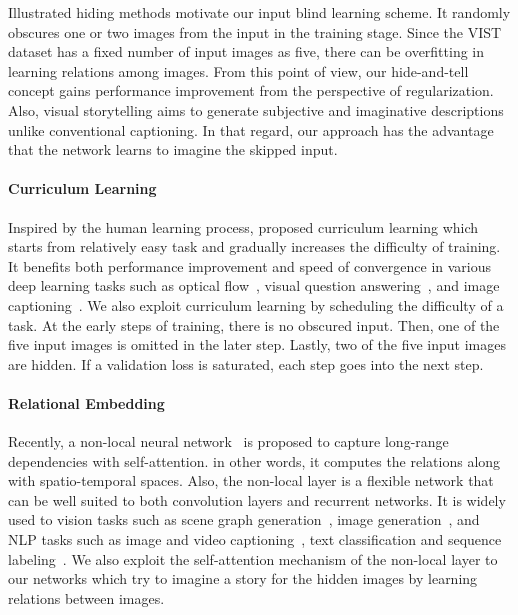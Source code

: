 \documentclass[letterpaper]{article} \usepackage{aaai20}  \usepackage{times}  \usepackage{helvet} \usepackage{courier}  \usepackage[hyphens]{url}  \usepackage{graphicx} \urlstyle{rm} \def\UrlFont{\rm}  \usepackage{graphicx}  \frenchspacing  \setlength{\pdfpagewidth}{8.5in}  \setlength{\pdfpageheight}{11in}
\newcommand{\citet}[1]{\citeauthor{#1} \shortcite{#1}}
\begin{document}
Illustrated hiding methods motivate our input blind learning scheme. It randomly obscures one or two images from the input in the training stage. 
Since the VIST dataset has a fixed number of input images as five, there can be overfitting in learning relations among images. From this point of view, our hide-and-tell concept gains performance improvement from the perspective of regularization.
Also, visual storytelling aims to generate subjective and imaginative descriptions unlike conventional captioning. In that regard, our approach has the advantage that the network learns to imagine the skipped input.






\paragraph{Curriculum Learning}
\quad

\noindent
Inspired by the human learning process, \citet{bengio2009curriculum} proposed curriculum learning which starts from relatively easy task and gradually increases the difficulty of training. It benefits both performance improvement and speed of convergence in various deep learning tasks such as optical flow~\cite{ilg2017flownet}, visual question answering~\cite{misra2018learning}, and image captioning~\cite{ren2017deep}. We also exploit curriculum learning by scheduling the difficulty of a task. At the early steps of training, there is no obscured input. Then, one of the five input images is omitted in the later step. Lastly, two of the five input images are hidden. If a validation loss is saturated, each step goes into the next step.





\paragraph{Relational Embedding}
\quad

\noindent
Recently, a non-local neural network~\cite{wang2018non} is proposed to capture long-range dependencies with self-attention. in other words, it computes the relations along with spatio-temporal spaces. 
Also, the non-local layer is a flexible network that can be well suited to both convolution layers and recurrent networks.
It is widely used to vision tasks such as scene graph generation~\cite{woo2018linknet}, image generation~\cite{zhang2018self}, 
and NLP tasks such as image and video captioning~\cite{gao2019hierarchical}, text classification and sequence labeling~\cite{liu2018contextualized}. 
We also exploit the self-attention mechanism of the non-local layer to our networks which try to imagine a story for the hidden images by learning relations between images. 
\end{document}

